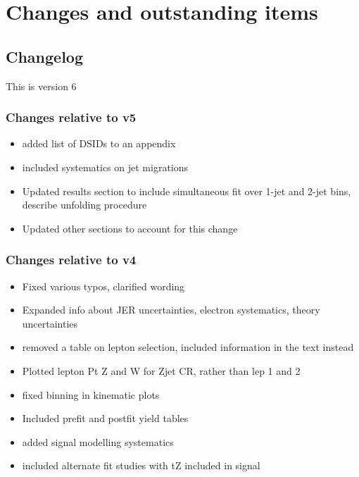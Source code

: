 \documentclass[NOTE, atlasdraft=true, texlive=2016, UKenglish]{\ATLASLATEXPATH atlasdoc}
\begin{document}
\maketitle

\tableofcontents

\clearpage

\section{Changes and outstanding items}
\label{sec:changes}

\subsection{Changelog}

This is version 6

\subsubsection{Changes relative to v5}
\begin{itemize}
  \item added list of DSIDs to an appendix
  \item included systematics on jet migrations
  \item Updated results section to include simultaneous fit over 1-jet and 2-jet bins, describe unfolding procedure
  \item Updated other sections to account for this change
\end{itemize}

\subsubsection{Changes relative to v4}
\begin{itemize}
  \item Fixed various typos, clarified wording
  \item Expanded info about JER uncertainties, electron systematics, theory uncertainties
  \item removed a table on lepton selection, included information in the text instead
  \item Plotted lepton Pt Z and W for Zjet CR, rather than lep 1 and 2
  \item fixed binning in kinematic plots
  \item Included prefit and postfit yield tables
  \item added signal modelling systematics
  \item included alternate fit studies with tZ included in signal
\end{itemize}
\end{document}
